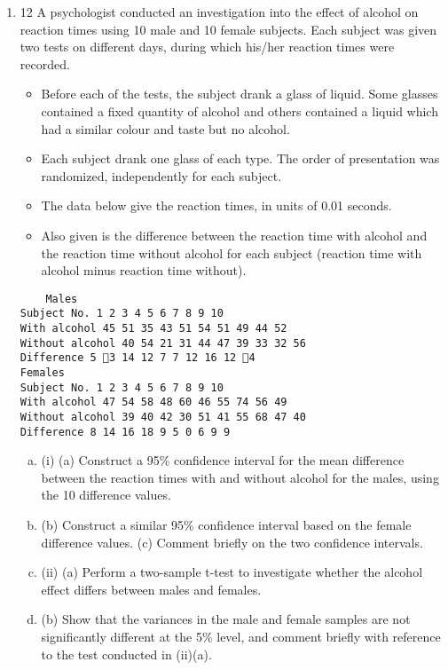 \documentclass[a4paper,12pt]{article}
\begin{document}
\begin{enumerate}
\item 12 A psychologist conducted an investigation into the effect of alcohol on reaction times
using 10 male and 10 female subjects. Each subject was given two tests on different
days, during which his/her reaction times were recorded.
\begin{itemize}
    \item Before each of the tests, the subject drank a glass of liquid. Some glasses contained a
fixed quantity of alcohol and others contained a liquid which had a similar colour and
taste but no alcohol.
\item Each subject drank one glass of each type. The order of
presentation was randomized, independently for each subject.
\item The data below give the reaction times, in units of 0.01 seconds.
\item Also given is the
difference between the reaction time with alcohol and the reaction time without
alcohol for each subject (reaction time with alcohol minus reaction time without).
\end{itemize}

\begin{verbatim}
    Males
Subject No. 1 2 3 4 5 6 7 8 9 10
With alcohol 45 51 35 43 51 54 51 49 44 52
Without alcohol 40 54 21 31 44 47 39 33 32 56
Difference 5 3 14 12 7 7 12 16 12 4
Females
Subject No. 1 2 3 4 5 6 7 8 9 10
With alcohol 47 54 58 48 60 46 55 74 56 49
Without alcohol 39 40 42 30 51 41 55 68 47 40
Difference 8 14 16 18 9 5 0 6 9 9
\end{verbatim}

\begin{enumerate}[(a)]
    \item (i) (a) Construct a 95\% confidence interval for the mean difference between
the reaction times with and without alcohol for the males, using the 10
difference values.
    \item  (b) Construct a similar 95\% confidence interval based on the female
difference values.
(c) Comment briefly on the two confidence intervals. 
    \item  (ii) (a) Perform a two-sample t-test to investigate whether the alcohol effect
differs between males and females.
    \item (b) Show that the variances in the male and female samples are not
significantly different at the 5\% level, and comment briefly with
reference to the test conducted in (ii)(a). 
\end{enumerate}



\end{enumerate}
\end{document}
